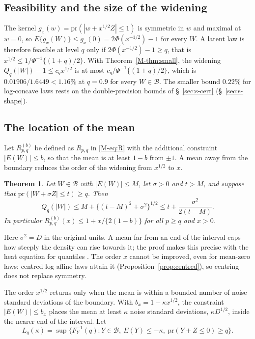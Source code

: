 \documentclass[11pt]{article}
\renewcommand{\_}{\usc\allowbreak}
\newtheorem{theorem}{Theorem}
\newcommand{\pr}{\mathrm{pr}}
\begin{document}
\subsection*{Feasibility and the size of the widening}\label{sec:s-feasible}

The kernel $g_x(w) = \pr(|w + x^{1/2}Z| \le 1)$ is symmetric in $w$ and maximal at $w = 0$, so $E\{g_x(W)\} \le g_x(0) = 2\Phi(x^{-1/2}) - 1$ for every $W$. A latent law is therefore feasible at level $q$ only if $2\Phi(x^{-1/2}) - 1 \ge q$, that is $x^{1/2} \le 1/\Phi^{-1}\{(1+q)/2\}$. With Theorem~\ref{M-thm:small}, the widening $Q_q(|W|) - 1 \le c_q x^{1/2}$ is at most $c_q/\Phi^{-1}\{(1+q)/2\}$, which is $0.01906/1.6449 < 1.16\%$ at $q = 0.9$ for every $W \in \mathcal B$. The smaller bound $0.22\%$ for log-concave laws rests on the double-precision bounds of \S~\ref{sec:s-cert} (\S~\ref{sec:s-shape}).

\subsection*{The location of the mean}

Let $R^{(b)}_{p,q}$ be defined as $R_{p,q}$ in \eqref{M-eq:R} with the additional constraint $|E(W)| \le b$, so that the mean is at least $1 - b$ from $\pm 1$. A mean away from the boundary reduces the order of the widening from $x^{1/2}$ to $x$.

\begin{theorem}\label{thm:mean}
Let $W \in \mathcal B$ with $|E(W)| \le M$, let $\sigma > 0$ and $t > M$, and suppose that $\pr(|W + \sigma Z| \le t) \ge q$. Then
\[
Q_q(|W|) \le M + \{(t - M)^2 + \sigma^2\}^{1/2} \le t + \frac{\sigma^2}{2(t - M)}.
\]
In particular $R^{(b)}_{p,q}(x) \le 1 + x/\{2(1 - b)\}$ for all $p \ge q$ and $x > 0$.
\end{theorem}

Here $\sigma^2 = D$ in the original units. A mean far from an end of the interval caps how steeply the density can rise towards it; the proof makes this precise with the heat equation for quantiles \citep{steinbrecher2008}. The order $x$ cannot be improved, even for mean-zero laws: centred log-affine laws attain it (Proposition~\ref{prop:centred}), so centring does not replace symmetry.

The order $x^{1/2}$ returns only when the mean is within a bounded number of noise standard deviations of the boundary. With $b_x = 1 - \kappa x^{1/2}$, the constraint $|E(W)| \le b_x$ places the mean at least $\kappa$ noise standard deviations, $\kappa D^{1/2}$, inside the nearer end of the interval. Let
\[
L_q(\kappa) = \sup\{F_Y^{-1}(q) : Y \in \mathcal B,\ E(Y) \le -\kappa,\ \pr(Y + Z \le 0) \ge q\}.
\]
\end{document}
